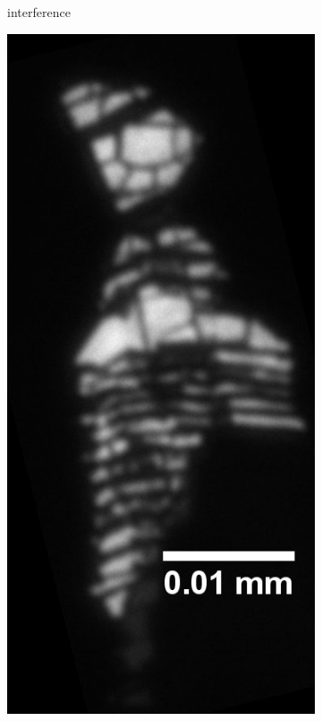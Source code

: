 \begin{figure}[!ht]
\begin{subfigure}{0.47\textwidth}
        \caption{interference}
	      \label{fig_mono_spec1_int}
    \end{subfigure}
    \hfill
    \begin{subfigure}{0.47\textwidth}
        \centering
        \includegraphics[width=\textwidth]{img/output_t1/M1_3_50_adj_photo}

\end{subfigure}
\end{figure}
